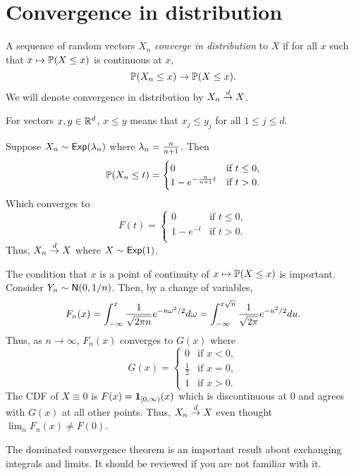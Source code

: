 \section{Convergence in distribution}
\begin{definition}
    A sequence of random vectors $X_n$ \emph{converge in distribution} to $X$ if for all $x$ such that $x \mapsto {\mathbb{P}}(X \le x)$ is continuous at $x$,
    \[{\mathbb{P}}(X_n \le x) \to {\mathbb{P}}(X \le x). \]
    We will denote convergence in distribution by $X_n \stackrel{d}{\to} X$.
\end{definition} 
\begin{remark}
    For vectors $x,y \in {\mathbb R}^d$, $x \le y$ means that $x_j \le y_j$ for all $1 \le j \le d$. 
\end{remark}
\begin{example}
    Suppose $X_n \sim \mathsf{Exp}(\lambda_n)$ where $\lambda_n = \frac{n}{n+1}$. Then 
    \[{\mathbb{P}}(X_n \le t) =\begin{cases}
        0 & \text{if } t \le 0,\\
        1-e^{-\frac{n}{n+1}t}& \text{if } t > 0.\\
    \end{cases} \]
    Which converges to 
    \[F(t) =\begin{cases}
        0 & \text{if } t \le 0,\\
        1-e^{-t}& \text{if } t > 0.\\
    \end{cases} \]
    Thus, $X_n \stackrel{d}{\to} X$ where $X \sim \mathsf{Exp}(1)$.
\end{example}
\begin{example}
    The condition that $x$ is a point of continuity of $x \mapsto {\mathbb{P}}(X \le x)$ is important. Consider $Y_n \sim \mathsf{N}(0,1/n)$. Then, by a change of variables,
    \[F_n(x) = \int_{-\infty}^x \frac{1}{\sqrt{2\pi n}}e^{-n{\omega}^2/2}d{\omega} = \int_{-\infty}^{x\sqrt{n}} \frac{1}{\sqrt{2\pi}}e^{-u^2/2}du. \]
    Thus, as $n \to \infty$, $F_n(x)$ converges to $G(x)$ where
    \[G(x) = \begin{cases}
        0 & \text{if } x < 0,\\
        \frac{1}{2} & \text{if } x=0,\\
        1 & \text{if } x > 0.
    \end{cases} \]
    The CDF of $X \equiv 0$ is $F(x)={{\bf 1}}_{[0,\infty)}(x)$ which is discontinuous at 0 and agrees with $G(x)$ at all other points. Thus, $X_n \stackrel{d}{\to} X$ even thought $\lim_n F_n(x) \neq F(0)$.
\end{example}
\begin{remark}
    The dominated convergence theorem is an important result about exchanging integrals and limits. It should be reviewed if you are not familiar with it.
\end{remark}

